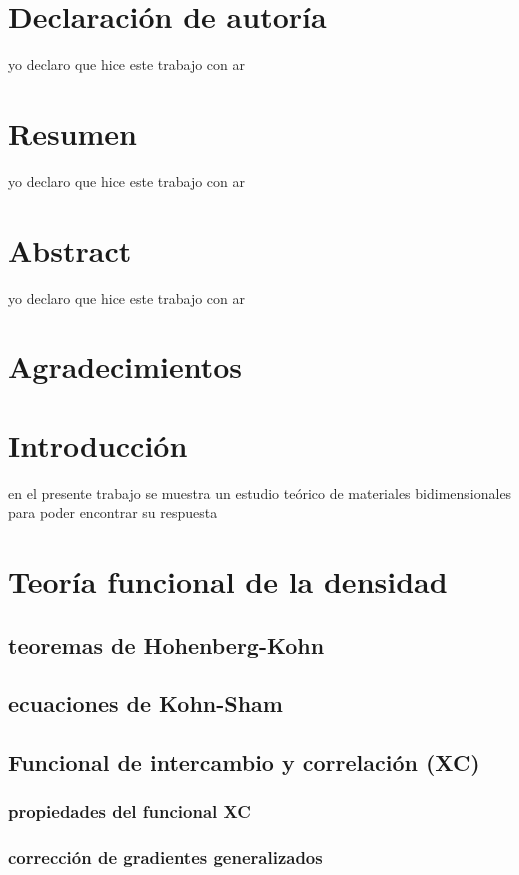 \documentclass[12pt,a4paper]{book}
\begin{document}
	\chapter*{Declaraci\'on de autor\'ia}
	\pagestyle{empty}
	yo declaro que hice este trabajo con ar
	\chapter*{Resumen}
	\pagestyle{empty}
	yo declaro que hice este trabajo con ar
	\chapter*{Abstract}
	\pagestyle{empty}
	yo declaro que hice este trabajo con ar
	\chapter*{Agradecimientos}
	\pagestyle{empty}
	
	\tableofcontents
	
	\chapter{Introducci\'on}
	en el presente trabajo se muestra un estudio  te\'orico de materiales bidimensionales para poder encontrar su respuesta 
	
	\chapter{Teor\'ia funcional de la densidad}
	
	\section{teoremas de Hohenberg-Kohn}
	
	\section{ecuaciones de Kohn-Sham}
	\section{Funcional de intercambio y correlaci\'on (XC)}
	\subsection{propiedades del funcional XC}
	\subsection{correcci\'on de gradientes generalizados}
\end{document}
